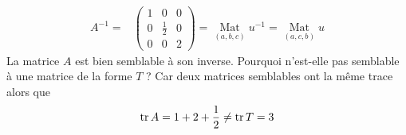 \begin{enumerate}
\begin{enumerate}
\begin{align*}
A^{-1} =&
\begin{pmatrix}
 1 & 0 & 0 \\
 0 & \frac{1}{2} & 0 \\
 0 & 0 & 2
\end{pmatrix}
 = \underset{(a,b,c)}{\mathop{\mathrm{Mat}}}u^{-1}
 = \underset{(a,c,b)}{\mathop{\mathrm{Mat}}}u 
\end{align*}
La matrice $A$ est bien semblable à son inverse.\newline
Pourquoi n'est-elle pas semblable à une matrice de la forme $T$ ?\newline
Car deux matrices semblables ont la même trace alors que  
\[\operatorname{tr} A =1 +2 +\frac{1}{2}\neq \operatorname{tr} T = 3\]
\end{enumerate}

\end{enumerate}

